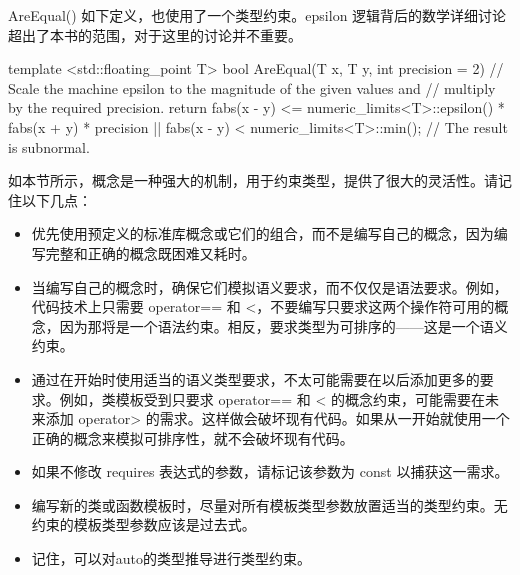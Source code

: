 AreEqual() 如下定义，也使用了一个类型约束。epsilon 逻辑背后的数学详细讨论超出了本书的范围，对于这里的讨论并不重要。

\begin{cpp}
template <std::floating_point T>
bool AreEqual(T x, T y, int precision = 2)
{
    // Scale the machine epsilon to the magnitude of the given values and
    // multiply by the required precision.
    return fabs(x - y) <= numeric_limits<T>::epsilon() * fabs(x + y) * precision
        || fabs(x - y) < numeric_limits<T>::min(); // The result is subnormal.
}
\end{cpp}


如本节所示，概念是一种强大的机制，用于约束类型，提供了很大的灵活性。请记住以下几点：

\begin{itemize}
\item
优先使用预定义的标准库概念或它们的组合，而不是编写自己的概念，因为编写完整和正确的概念既困难又耗时。

\item
当编写自己的概念时，确保它们模拟语义要求，而不仅仅是语法要求。例如，代码技术上只需要 operator== 和 <，不要编写只要求这两个操作符可用的概念，因为那将是一个语法约束。相反，要求类型为可排序的——这是一个语义约束。

\item
通过在开始时使用适当的语义类型要求，不太可能需要在以后添加更多的要求。例如，类模板受到只要求 operator== 和 < 的概念约束，可能需要在未来添加 operator> 的需求。这样做会破坏现有代码。如果从一开始就使用一个正确的概念来模拟可排序性，就不会破坏现有代码。

\item
如果不修改 requires 表达式的参数，请标记该参数为 const 以捕获这一需求。

\item
编写新的类或函数模板时，尽量对所有模板类型参数放置适当的类型约束。无约束的模板类型参数应该是过去式。

\item
记住，可以对auto的类型推导进行类型约束。
\end{itemize}

















